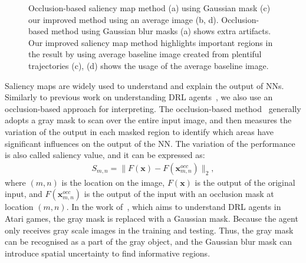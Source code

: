 \begin{figure}[h!]
\begin{subfigure}{0.24\columnwidth}
  \end{subfigure}
  \caption{Occlusion-based saliency map method (a) using Gaussian mask (c) our improved method using an average image (b, d). Occlusion-based method using Gaussian blur masks (a) shows extra artifacts. Our improved saliency map method highlights important regions in the result by using average baseline image created from plentiful trajectories (c), (d) shows the usage of the average baseline image.}
  \label{fig:saliency_baseline}
\end{figure}

Saliency maps are widely used to understand and explain the output of NNs. Similarly to previous work on understanding DRL agents~\cite{greydanus2018visualizing}, we also use an occlusion-based approach for interpreting. The occlusion-based method~\cite{zeiler2014visualizing} generally adopts a gray mask to scan over the entire input image, and then measures the variation of the output in each masked region to identify which areas have significant influences on the output of the NN. The variation of the performance is also called saliency value, and it can be expressed as:
\begin{align}
S_{m, n} = \lVert F(\mathbf{x}) - F(\mathbf{x}_{m, n}^{occ}) \rVert_2,
\end{align}
where $(m, n)$ is the location on the image, $F(\mathbf{x})$ is the output of the original input, and $F(\mathbf{x}_{m, n}^{occ})$ is the output of the input with an occlusion mask at location $(m, n)$. In the work of~\cite{greydanus2018visualizing}, which aims to understand DRL agents in Atari games, the gray mask is replaced with a Gaussian mask. Because the agent only receives gray scale images in the training and testing. Thus, the gray mask can be recognised as a part of the gray object, and the Gaussian blur mask can introduce spatial uncertainty to find informative regions. 

